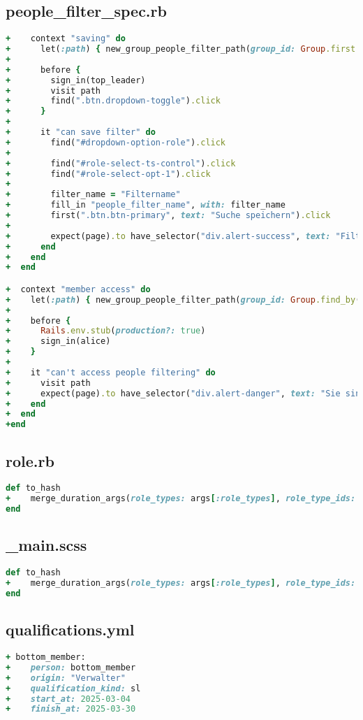 \subsection{people\_filter\_spec.rb}
\begin{lstlisting}[language=Ruby]
+    context "saving" do
+      let(:path) { new_group_people_filter_path(group_id: Group.first.id) }
+
+      before {
+        sign_in(top_leader)
+        visit path
+        find(".btn.dropdown-toggle").click
+      }
+
+      it "can save filter" do
+        find("#dropdown-option-role").click
+
+        find("#role-select-ts-control").click
+        find("#role-select-opt-1").click
+
+        filter_name = "Filtername"
+        fill_in "people_filter_name", with: filter_name
+        first(".btn.btn-primary", text: "Suche speichern").click
+
+        expect(page).to have_selector("div.alert-success", text: "Filter #{filter_name} wurde erfolgreich erstellt.")
+      end
+    end
+  end     

+  context "member access" do
+    let(:path) { new_group_people_filter_path(group_id: Group.find_by(name: "Top").id) }
+
+    before {
+      Rails.env.stub(production?: true)
+      sign_in(alice)
+    }
+
+    it "can't access people filtering" do
+      visit path
+      expect(page).to have_selector("div.alert-danger", text: "Sie sind nicht berechtigt, diese Seite anzuzeigen")
+    end
+  end
+end    
\end{lstlisting}

\subsection{role.rb}
\begin{lstlisting}[language=Ruby]
def to_hash
+    merge_duration_args(role_types: args[:role_types], role_type_ids: args[:role_type_ids], kind: args[:kind])
end
\end{lstlisting}

\newpage

\subsection{\_main.scss}
\begin{lstlisting}[language=Ruby]
def to_hash
+    merge_duration_args(role_types: args[:role_types], role_type_ids: args[:role_type_ids], kind: args[:kind])
end
\end{lstlisting}

\subsection{qualifications.yml}
\begin{lstlisting}[language=Ruby]
+ bottom_member:
+    person: bottom_member
+    origin: "Verwalter"
+    qualification_kind: sl
+    start_at: 2025-03-04
+    finish_at: 2025-03-30
\end{lstlisting}

